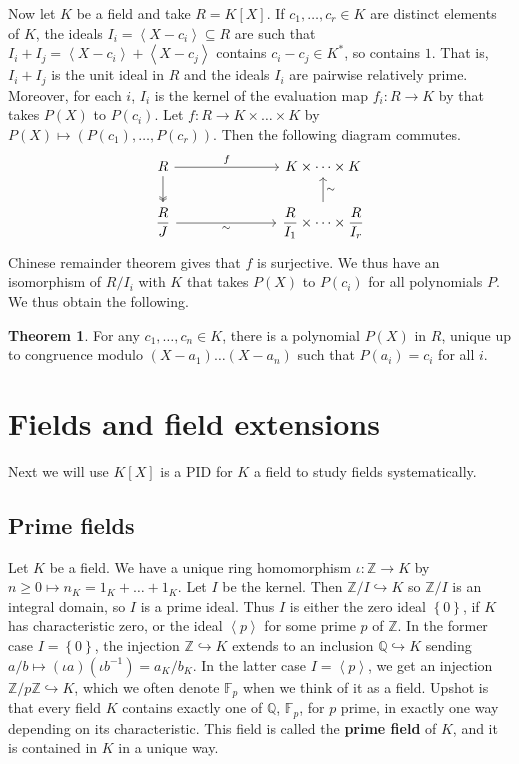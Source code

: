 \documentclass{article}
\newcommand{\F}{\mathbb{F}}
\newcommand{\Z}{\mathbb{Z}}
\newcommand{\Q}{\mathbb{Q}}
\newcommand{\rb}[1]{\left( #1 \right)}
\renewcommand{\sb}[1]{\left[ #1 \right]}
\newcommand{\cb}[1]{\left\{ #1 \right\}}
\newcommand{\ab}[1]{\left\langle #1 \right\rangle}
\theoremstyle{definition}\newtheorem{definition}{Definition}[subsection]
\theoremstyle{definition}\newtheorem{remark}[definition]{Remark}
\theoremstyle{definition}\newtheorem*{example}{Example}
\theoremstyle{definition}\newtheorem*{note}{Note}
\newtheorem{theorem}[definition]{Theorem}
\begin{document}
Now let $ K $ be a field and take $ R = K\sb{X} $. If $ c_1, \dots, c_r \in K $ are distinct elements of $ K $, the ideals $ I_i = \ab{X - c_i} \subseteq R $ are such that $ I_i + I_j = \ab{X - c_i} + \ab{X - c_j} $ contains $ c_i - c_j \in K^* $, so contains $ 1 $. That is, $ I_i + I_j $ is the unit ideal in $ R $ and the ideals $ I_i $ are pairwise relatively prime. Moreover, for each $ i $, $ I_i $ is the kernel of the evaluation map $ f_i : R \to K $ by that takes $ P\rb{X} $ to $ P\rb{c_i} $. Let $ f : R \to K \times \dots \times K $ by $ P\rb{X} \mapsto \rb{P\rb{c_1}, \dots, P\rb{c_r}} $. Then the following diagram commutes.
$$
\begin{tikzcd}[column sep=1in]
R \arrow{r}{f} \arrow[two heads]{d} & K \times \dots \times K \\
\dfrac{R}{J} \arrow[swap]{r}{\sim} & \dfrac{R}{I_1} \times \dots \times \dfrac{R}{I_r} \arrow[swap]{u}{\sim}
\end{tikzcd}
$$
Chinese remainder theorem gives that $ f $ is surjective. We thus have an isomorphism of $ R / I_i $ with $ K $ that takes $ P\rb{X} $ to $ P\rb{c_i} $ for all polynomials $ P $. We thus obtain the following.

\begin{theorem}
For any $ c_1, \dots, c_n \in K $, there is a polynomial $ P\rb{X} $ in $ R $, unique up to congruence modulo $ \rb{X - a_1} \dots \rb{X - a_n} $ such that $ P\rb{a_i} = c_i $ for all $ i $.
\end{theorem}


\section{Fields and field extensions}

Next we will use $ K\sb{X} $ is a PID for $ K $ a field to study fields systematically.

\subsection{Prime fields}

Let $ K $ be a field. We have a unique ring homomorphism $ \iota : \Z \to K $ by $ n \ge 0 \mapsto n_K = 1_K + \dots + 1_K $. Let $ I $ be the kernel. Then $ \Z / I \hookrightarrow K $ so $ \Z / I $ is an integral domain, so $ I $ is a prime ideal. Thus $ I $ is either the zero ideal $ \cb{0} $, if $ K $ has characteristic zero, or the ideal $ \ab{p} $ for some prime $ p $ of $ \Z $. In the former case $ I = \cb{0} $, the injection $ \Z \hookrightarrow K $ extends to an inclusion $ \Q \hookrightarrow K $ sending $ a / b \mapsto \rb{\iota a}\rb{\iota b^{-1}} = a_K / b_K $. In the latter case $ I = \ab{p} $, we get an injection $ \Z / p\Z \hookrightarrow K $, which we often denote $ \F_p $ when we think of it as a field. Upshot is that every field $ K $ contains exactly one of $ \Q $, $ \F_p $, for $ p $ prime, in exactly one way depending on its characteristic. This field is called the \textbf{prime field} of $ K $, and it is contained in $ K $ in a unique way.
\end{document}
